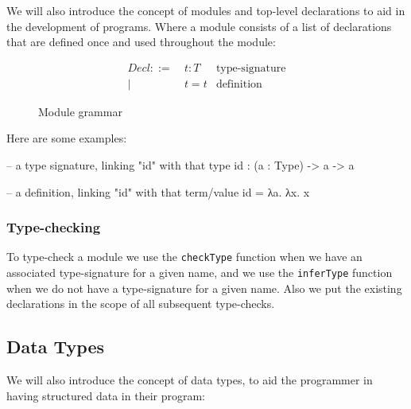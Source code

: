 \documentclass[12pt]{article}
\theoremstyle{definition}
\newcommand{\code}[1]{\texttt{#1}}
\begin{document}
We will also introduce the concept of modules and top-level declarations to aid in the development of programs. Where a module consists of a list of declarations that are defined once and used throughout the module:

\begin{figure}[H]
       \[
              \begin{aligned}
                     Decl ::= & \ t : T & \text{type-signature} \\
                     |        & \ t = t & \text{definition}
              \end{aligned}
       \]
       \caption{Module grammar}
\end{figure}


Here are some examples:

\begin{piforall}
-- a type signature, linking "id" with that type
id : (a : Type) -> a -> a

-- a definition, linking "id" with that term/value
id = λa. λx. x
\end{piforall}

\subsubsection{Type-checking}

To type-check a module we use the \code{checkType} function when we have an associated type-signature for a given name, and we use the \code{inferType} function when we do not have a type-signature for a given name. Also we put the existing declarations in the scope of all subsequent type-checks.

\subsection{Data Types}

We will also introduce the concept of data types, to aid the programmer in having structured data in their program:
\end{document}
